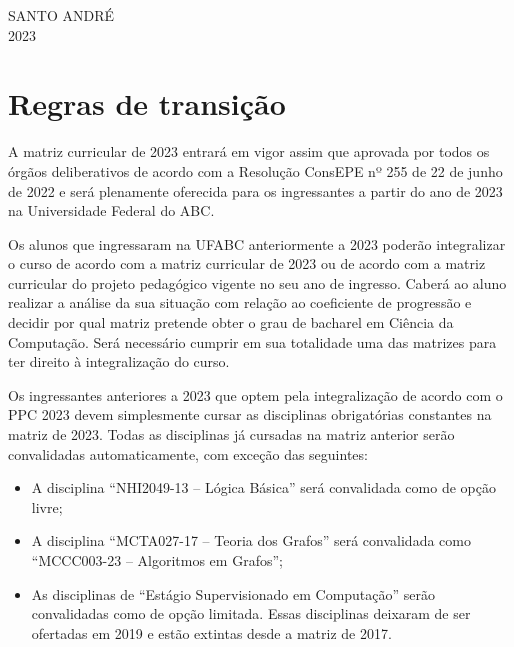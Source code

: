 \documentclass[a4paper]{article}
\begin{document}
\begin{center}
    SANTO ANDRÉ \\ 2023
\end{center}

\newpage

\section{Regras de transição}
\label{sec:regras_transicao}

A matriz curricular de 2023 entrará em vigor assim que aprovada por
todos os órgãos deliberativos de acordo com a Resolução ConsEPE nº 255
de 22 de junho de 2022 e será plenamente oferecida para os
ingressantes a partir do ano de 2023 na Universidade Federal do ABC.

Os alunos que ingressaram na UFABC anteriormente a 2023 poderão integralizar o
curso de acordo com a matriz curricular de 2023 ou de acordo com a matriz
curricular do projeto pedagógico vigente no seu ano de ingresso.
Caberá ao aluno realizar a análise da sua situação com relação ao coeficiente
de progressão e decidir por qual matriz pretende obter o grau de bacharel em
Ciência da Computação.
Será necessário cumprir em sua totalidade uma das matrizes para ter direito à
integralização do curso.

Os ingressantes anteriores a 2023 que optem pela integralização de acordo com
o PPC 2023 devem simplesmente cursar as disciplinas obrigatórias constantes na
matriz de 2023.
Todas as disciplinas já cursadas na matriz anterior serão convalidadas
automaticamente, com exceção das seguintes:
\begin{itemize}
    \item A disciplina ``NHI2049-13 -- Lógica Básica'' será convalidada como de
    opção livre;
    \item A disciplina ``MCTA027-17 -- Teoria dos Grafos'' será convalidada
    como ``MCCC003-23 -- Algoritmos em Grafos'';
    \item As disciplinas de ``Estágio Supervisionado em Computação'' serão
    convalidadas como de opção limitada. Essas disciplinas deixaram de ser
    ofertadas em 2019 e estão extintas desde a matriz de 2017.
\end{itemize}
\end{document}
